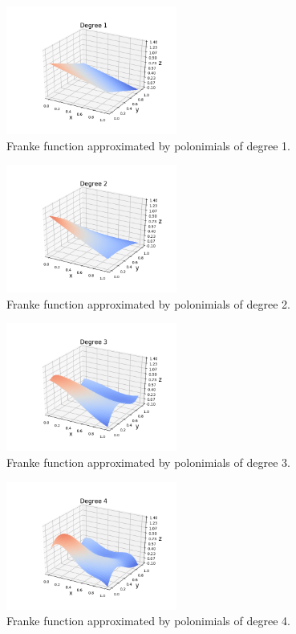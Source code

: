 \documentclass[reprint,english,notitlepage]{revtex4-1}  %
\begin{document}
\begin{figure}[h]
    \centering
    \includegraphics[width=0.50\textwidth]{OLS_deg1.png}
    \caption{Franke function approximated by polonimials of degree 1.}
    \label{ols: 1}
\end{figure}

\begin{figure}[h]
    \centering
    \includegraphics[width=0.50\textwidth]{OLS_deg2.png}
    \caption{Franke function approximated by polonimials of degree 2.}
    \label{ols: 2}
\end{figure}

\begin{figure}[h]
    \centering
    \includegraphics[width=0.50\textwidth]{OLS_deg3.png}
    \caption{Franke function approximated by polonimials of degree 3.}
    \label{ols: 3}
\end{figure}

\begin{figure}[h]
    \centering
    \includegraphics[width=0.50\textwidth]{OLS_deg4.png}
    \caption{Franke function approximated by polonimials of degree 4.}
    \label{ols: 4}
\end{figure}
\end{document}
